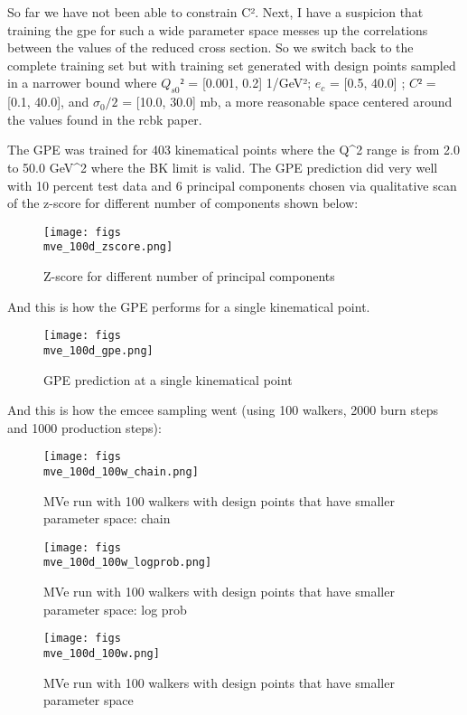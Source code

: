 \documentclass{article}
\begin{document}
So far we have not been able to constrain C². Next, I have a suspicion that training the gpe for such a wide parameter space messes up the correlations between the values of the reduced cross section. So we switch back to the complete training set but with training set generated with design points sampled in a narrower bound where $Q_{s0}²$ = [0.001, 0.2] 1/GeV²; $e_c$ = [0.5, 40.0] ; $C²$ = [0.1, 40.0], and $\sigma_{0}/2$ = [10.0, 30.0] mb, a more reasonable space centered around the values found in the rcbk paper. 

The GPE was trained for 403 kinematical points where the Q^2 range is from 2.0 to 50.0 GeV^2 where the BK limit is valid. The GPE prediction did very well with 10 percent test data and 6 principal components chosen via qualitative scan of the z-score for different number of components shown below:

\begin{figure}
\centering
\texttt{[image: figs\\mve\_100d\_zscore.png]}
\caption{Z-score for different number of principal components}
\label{fig:mve_100d_zscore}
\end{figure}

And this is how the GPE performs for a single kinematical point. 

\begin{figure}
\centering
\texttt{[image: figs\\mve\_100d\_gpe.png]}
\caption{GPE prediction at a single kinematical point}
\label{fig:mve_100d_gpe}
\end{figure}

And this is how the emcee sampling went (using 100 walkers, 2000 burn steps and 1000 production steps):

\begin{figure}
\centering
\texttt{[image: figs\\mve\_100d\_100w\_chain.png]}
\caption{MVe run with 100 walkers with design points that have smaller parameter space: chain}
\label{fig:mve_100d_100w_chain}
\end{figure}

\begin{figure}
\centering
\texttt{[image: figs\\mve\_100d\_100w\_logprob.png]}
\caption{MVe run with 100 walkers with design points that have smaller parameter space: log prob}
\label{fig:mve_100d_100w_logprob}
\end{figure}

\begin{figure}
\centering
\texttt{[image: figs\\mve\_100d\_100w.png]}
\caption{MVe run with 100 walkers with design points that have smaller parameter space}
\label{fig:mve_100d_100w}
\end{figure}
\end{document}
